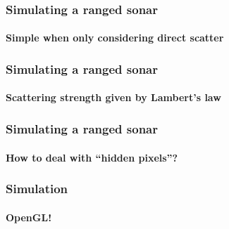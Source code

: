 \documentclass[
    beamer                                       %
  ,table,dvipsnames,svgnames
]{common/mytemplate}
\begin{document}
{
%
\begin{frame}
\frametitle{Simulating a ranged sonar}
\framesubtitle{Simple when only considering direct scatter}
\vspace{8cm}
\end{frame}
}


{
%
\begin{frame}
\frametitle{Simulating a ranged sonar}
\framesubtitle{Scattering strength given by Lambert's law}
\vspace{8cm}                                                                                                                                                                                                                                                                                               
\end{frame}
}


{
%
\begin{frame}
\frametitle{Simulating a ranged sonar}
\framesubtitle{How to deal with ``hidden pixels''?}
\vspace{8cm}                                                                                                                                                                                                                                                                                               
\end{frame}
}


{
%
\begin{frame}
\frametitle{Simulation}
\framesubtitle{OpenGL!}
\vspace{8cm}                                                                                                                                                                                                                                                                                               
\end{frame}
}
\end{document}

